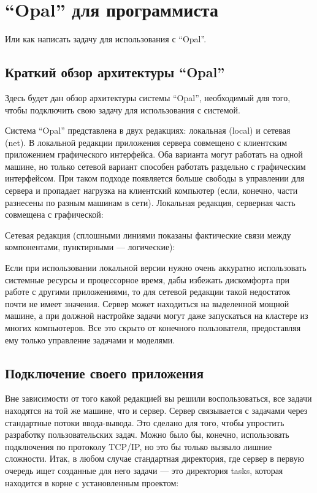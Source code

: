 \chapter{“Opal” для программиста}

Или как написать задачу для использования с “Opal”.

\section{Краткий обзор архитектуры “Opal”}
Здесь будет дан обзор архитектуры системы “Opal”, необходимый для того, чтобы подключить свою задачу для использования с системой.

Система “Opal” представлена в двух редакциях: локальная (local) и сетевая (net). В локальной редакции приложения сервера совмещено с клиентским приложением графического интерфейса. Оба варианта могут работать на одной машине, но только сетевой вариант способен работать раздельно с графическим интерфейсом. При таком подходе появляется больше свободы в управлении для сервера и пропадает нагрузка на клиентский компьютер (если, конечно, части разнесены по разным машинам в сети).
Локальная редакция, серверная часть совмещена с графической:

Сетевая редакция (сплошными линиями показаны фактические связи между компонентами, пунктирными — логические):

Если при использовании локальной версии нужно очень аккуратно использовать системные ресурсы и процессорное время, дабы избежать дискомфорта при работе с другими приложениями, то для сетевой редакции такой недостаток почти не имеет значения. Сервер может находиться на выделенной мощной машине, а при должной настройке задачи могут даже запускаться на кластере из многих компьютеров. Все это скрыто от конечного пользователя, предоставляя ему только управление задачами и моделями.

\section{Подключение своего приложения}

Вне зависимости от того какой редакцией вы решили воспользоваться, все задачи находятся на той же машине, что и сервер. Сервер связывается с задачами через стандартные потоки ввода-вывода. Это сделано для того, чтобы упростить разработку пользовательских задач. Можно было бы, конечно, использовать подключения по протоколу TCP/IP, но это бы только вызвало лишние сложности.
Итак, в любом случае стандартная директория, где сервер в первую очередь ищет созданные для него задачи — это директория tasks, которая находится в корне с установленным проектом:

